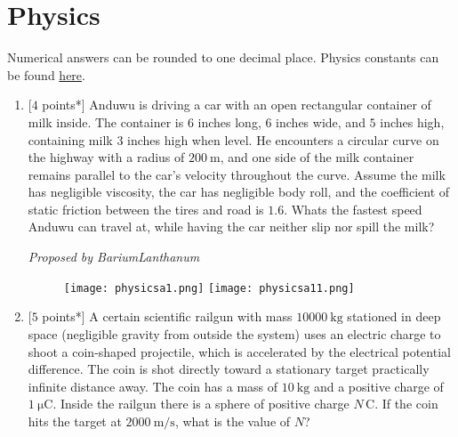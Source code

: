 \section*{\textsf{\textbf{\textcolor{meared}{Physics}}}}
Numerical answers can be rounded to one decimal place. Physics constants can be found \href{https://en.wikipedia.org/wiki/List_of_physical_constants}{here}.
\begin{enumerate}[align=left,start=1,label=\textbf{\textcolor{meared}{Problem \arabic*}}]
    \item {[$4$ points*]}
        Anduwu is driving a car with an open rectangular container of milk inside. The container is $6$ inches long, $6$ inches wide, and $5$ inches high, containing milk $3$ inches high when level. He encounters a circular curve on the highway with a radius of $\qty{200}{\meter}$, and one side of the milk container remains parallel to the car's velocity throughout the curve. Assume the milk has negligible viscosity, the car has negligible body roll, and the coefficient of static friction between the tires and road is $1.6$. Whats the fastest speed Anduwu can travel at, while having the car neither slip nor spill the milk?

        \textrm{\emph{Proposed by BariumLanthanum}}
        \begin{figure}[!ht]
            \centering
            \texttt{[image: physicsa1.png]}
            \texttt{[image: physicsa11.png]}
        \end{figure}
    \item {[$5$ points*]} 
         A certain scientific railgun with mass $\qty{10000}{\kilo\gram}$ stationed in deep space (negligible gravity from outside the system) uses an electric charge to shoot a coin-shaped projectile, which is accelerated by the electrical potential difference. The coin is shot directly toward a stationary target practically infinite distance away. The coin has a mass of $\qty{10}{\kilo\gram}$ and a positive charge of $\qty{1}{\micro\coulomb}$. Inside the railgun there is a sphere of positive charge $N\,\unit{\coulomb}$. If the coin hits the target at $\qty[per-mode = symbol]{2000}{\meter\per\second}$, what is the value of $N$?


\end{enumerate}
